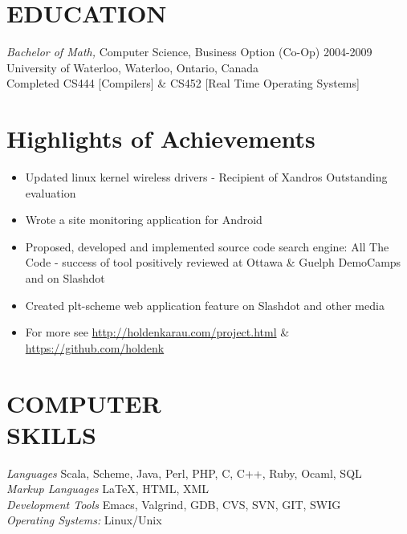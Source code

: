 \documentclass[10pt,line,margin=0.1]{newsres}
\begin{document}
\address{3407 24th St, Apt \#2, San Francisco, CA, USA}
\address{E-mail: holden@pigscanfly.ca, Cell: (425) 233-8271}
 
\begin{resume}
  
\section{EDUCATION} {\sl Bachelor of Math,} Computer Science, Business Option (Co-Op) 2004-2009 \\
                University of Waterloo, Waterloo, Ontario, Canada \\
                Completed CS444 [Compilers] \& CS452 [Real Time Operating Systems]
 
\section{Highlights of Achievements}
\begin{itemize}  \itemsep -2pt %
\item{Updated linux kernel wireless drivers - Recipient of Xandros Outstanding evaluation}
\item{Wrote a site monitoring application for Android}
\item{Proposed, developed and implemented source code search engine: All The Code - success of tool positively reviewed at Ottawa \& Guelph DemoCamps and on Slashdot}
\item{Created plt-scheme web application feature on Slashdot and other media}
\item{For more see \url{http://holdenkarau.com/project.html} \& \url{https://github.com/holdenk}}
\end{itemize}
\section{COMPUTER \\ SKILLS} {\sl Languages} Scala, Scheme, Java, Perl, PHP, C, C++, Ruby, Ocaml, SQL \\
                {\sl Markup Languages} \LaTeX , HTML, XML \\
                {\sl Development Tools} Emacs, Valgrind, GDB, CVS, SVN, GIT, SWIG \\
                {\sl Operating Systems:}  Linux/Unix \\
 

\end{resume}
\end{document}
